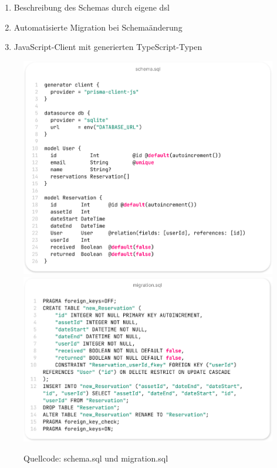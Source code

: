\begin{enumerate}
  \item Beschreibung des Schemas durch eigene \ac{dsl}
  \item Automatisierte Migration bei Schemaänderung
  \item JavaScript-Client mit generierten TypeScript-Typen
\end{enumerate}

\begin{figure}[p]
  \centering
  \includegraphics[scale=0.35]{Bilder/Code/schemasql.png}
  \includegraphics[scale=0.35]{Bilder/Code/migrationsql.png}
  \caption{Quellcode: schema.sql und migration.sql}
  \label{fig:prisma}
\end{figure}


